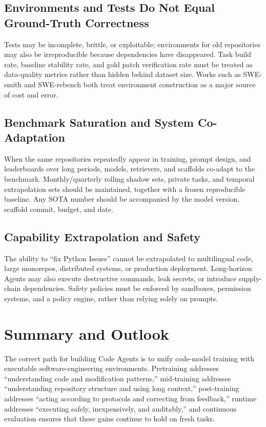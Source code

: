 \documentclass[10pt,a4paper,UTF8,fontset=none]{ctexart}
\begin{document}
\subsection{Environments and Tests Do Not Equal Ground-Truth Correctness}

Tests may be incomplete, brittle, or exploitable; environments for old repositories may also be irreproducible because dependencies have disappeared. Task build rate, baseline stability rate, and gold patch verification rate must be treated as data-quality metrics rather than hidden behind dataset size. Works such as SWE-smith and SWE-rebench both treat environment construction as a major source of cost and error\cite{yang2025swesmith,badertdinov2025swerebench}.

\subsection{Benchmark Saturation and System Co-Adaptation}

When the same repositories repeatedly appear in training, prompt design, and leaderboards over long periods, models, retrievers, and scaffolds co-adapt to the benchmark. Monthly/quarterly rolling shadow sets, private tasks, and temporal extrapolation sets should be maintained, together with a frozen reproducible baseline. Any SOTA number should be accompanied by the model version, scaffold commit, budget, and date.

\subsection{Capability Extrapolation and Safety}

The ability to ``fix Python Issues'' cannot be extrapolated to multilingual code, large monorepos, distributed systems, or production deployment. Long-horizon Agents may also execute destructive commands, leak secrets, or introduce supply-chain dependencies. Safety policies must be enforced by sandboxes, permission systems, and a policy engine, rather than relying solely on prompts.

\section{Summary and Outlook}

The correct path for building Code Agents is to unify code-model training with executable software-engineering environments. Pretraining addresses ``understanding code and modification patterns,'' mid-training addresses ``understanding repository structure and using long context,'' post-training addresses ``acting according to protocols and correcting from feedback,'' runtime addresses ``executing safely, inexpensively, and auditably,'' and continuous evaluation ensures that these gains continue to hold on fresh tasks.
\end{document}
